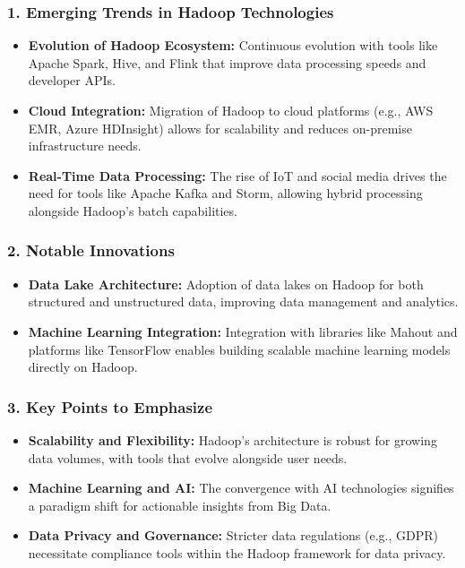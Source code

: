 \documentclass[aspectratio=169]{beamer}
\begin{document}
\begin{frame}
  \frametitle{1. Emerging Trends in Hadoop Technologies}
  \begin{itemize}
    \item \textbf{Evolution of Hadoop Ecosystem:} Continuous evolution with tools like Apache Spark, Hive, and Flink that improve data processing speeds and developer APIs.
    
    \item \textbf{Cloud Integration:} Migration of Hadoop to cloud platforms (e.g., AWS EMR, Azure HDInsight) allows for scalability and reduces on-premise infrastructure needs.
    
    \item \textbf{Real-Time Data Processing:} The rise of IoT and social media drives the need for tools like Apache Kafka and Storm, allowing hybrid processing alongside Hadoop's batch capabilities.
  \end{itemize}
\end{frame}

\begin{frame}
  \frametitle{2. Notable Innovations}
  \begin{itemize}
    \item \textbf{Data Lake Architecture:} Adoption of data lakes on Hadoop for both structured and unstructured data, improving data management and analytics.
    
    \item \textbf{Machine Learning Integration:} Integration with libraries like Mahout and platforms like TensorFlow enables building scalable machine learning models directly on Hadoop.
  \end{itemize}
\end{frame}

\begin{frame}
  \frametitle{3. Key Points to Emphasize}
  \begin{itemize}
    \item \textbf{Scalability and Flexibility:} Hadoop's architecture is robust for growing data volumes, with tools that evolve alongside user needs.
    
    \item \textbf{Machine Learning and AI:} The convergence with AI technologies signifies a paradigm shift for actionable insights from Big Data.
    
    \item \textbf{Data Privacy and Governance:} Stricter data regulations (e.g., GDPR) necessitate compliance tools within the Hadoop framework for data privacy.
  \end{itemize}
\end{frame}
\end{document}
